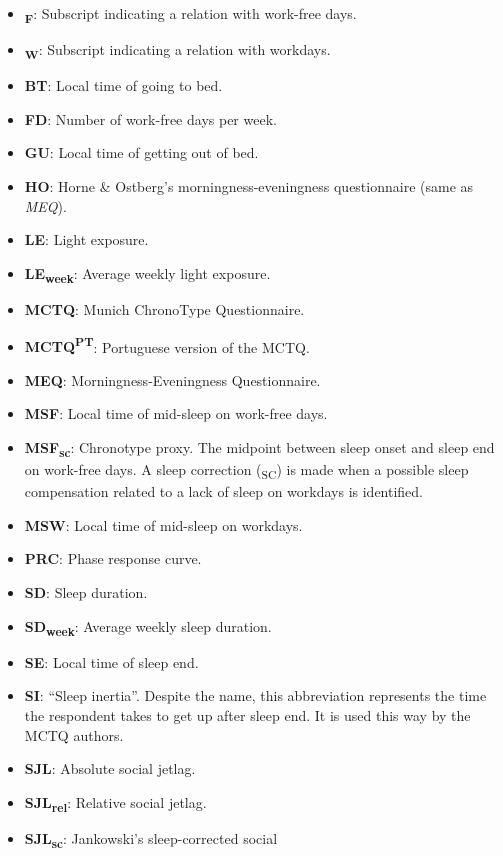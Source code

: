 \documentclass[
  12pt,
  a4paper,
  oneside]{tesesusp}
\providecommand{\tightlist}{%
  \setlength{\itemsep}{0pt}\setlength{\parskip}{0pt}}\usepackage{longtable,booktabs,array}
\begin{document}
\begin{itemize}
\tightlist
\item
  \textbf{\textsubscript{F}}: Subscript indicating a relation with
  work-free days.
\item
  \textbf{\textsubscript{W}}: Subscript indicating a relation with
  workdays.
\item
  \textbf{BT}: Local time of going to bed.
\item
  \textbf{FD}: Number of work-free days per week.
\item
  \textbf{GU}: Local time of getting out of bed.
\item
  \textbf{HO}: Horne \& Ostberg's morningness-eveningness questionnaire
  (same as \emph{MEQ}).
\item
  \textbf{LE}: Light exposure.
\item
  \textbf{LE\textsubscript{week}}: Average weekly light exposure.
\item
  \textbf{MCTQ}: Munich ChronoType Questionnaire.
\item
  \textbf{MCTQ\textsuperscript{PT}}: Portuguese version of the MCTQ.
\item
  \textbf{MEQ}: Morningness-Eveningness Questionnaire.
\item
  \textbf{MSF}: Local time of mid-sleep on work-free days.
\item
  \textbf{MSF\textsubscript{sc}}: Chronotype proxy. The midpoint between
  sleep onset and sleep end on work-free days. A sleep correction
  (\textsubscript{SC}) is made when a possible sleep compensation
  related to a lack of sleep on workdays is identified.
\item
  \textbf{MSW}: Local time of mid-sleep on workdays.
\item
  \textbf{PRC}: Phase response curve.
\item
  \textbf{SD}: Sleep duration.
\item
  \textbf{SD\textsubscript{week}}: Average weekly sleep duration.
\item
  \textbf{SE}: Local time of sleep end.
\item
  \textbf{SI}: ``Sleep inertia''. Despite the name, this abbreviation
  represents the time the respondent takes to get up after sleep end. It
  is used this way by the MCTQ authors.
\item
  \textbf{SJL}: Absolute social jetlag.
\item
  \textbf{SJL\textsubscript{rel}}: Relative social jetlag.
\item
  \textbf{SJL\textsubscript{sc}}: Jankowski's sleep-corrected social

\end{itemize}
\end{document}
